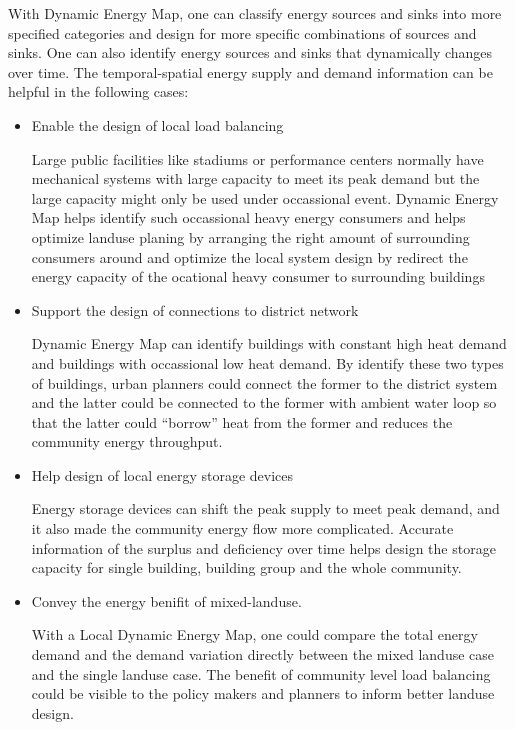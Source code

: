 \documentclass[hidelinks,12pt]{article}
\begin{document}
With Dynamic Energy Map, one can classify energy sources and sinks
into more specified categories and design for more specific
combinations of sources and sinks. One can also identify energy
sources and sinks that dynamically changes over time. The
temporal-spatial energy supply and demand information can be helpful
in the following cases:
\begin{itemize}
\item Enable the design of local load balancing

  Large public facilities like stadiums or performance centers
  normally have mechanical systems with large capacity to meet its
  peak demand but the large capacity might only be used under
  occassional event. Dynamic Energy Map helps identify such
  occassional heavy energy consumers and helps optimize landuse
  planing by arranging the right amount of surrounding consumers
  around and optimize the local system design by redirect the energy
  capacity of the ocational heavy consumer to surrounding
  buildings~\cite{IDEA2012}

\item Support the design of connections to district network

  Dynamic Energy Map can identify buildings with constant high heat
  demand and buildings with occassional low heat demand. By identify
  these two types of buildings, urban planners could connect the
  former to the district system and the latter could be connected to
  the former with ambient water loop so that the latter could
  ``borrow'' heat from the former and reduces the community energy
  throughput.

\item Help design of local energy storage devices

  Energy storage devices can shift the peak supply to meet peak
  demand, and it also made the community energy flow more
  complicated. Accurate information of the surplus and deficiency over
  time helps design the storage capacity for single building, building
  group and the whole community.

\item Convey the energy benifit of mixed-landuse.

  With a Local Dynamic Energy Map, one could compare the total energy
  demand and the demand variation directly between the mixed landuse
  case and the single landuse case. The benefit of community level
  load balancing could be visible to the policy makers and planners to
  inform better landuse design.

\end{itemize}
\end{document}
